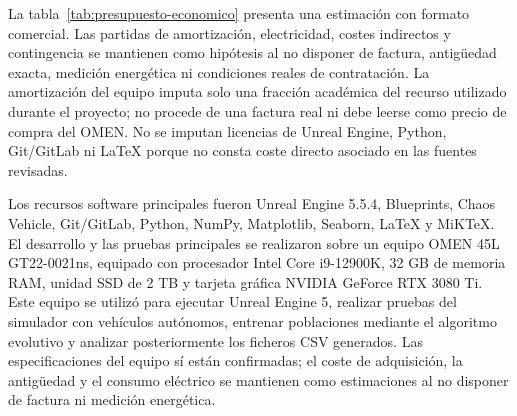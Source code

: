 La tabla~\ref{tab:presupuesto-economico} presenta una estimación con formato comercial. Las partidas de amortización, electricidad, costes indirectos y contingencia se mantienen como hipótesis al no disponer de factura, antigüedad exacta, medición energética ni condiciones reales de contratación. La amortización del equipo imputa solo una fracción académica del recurso utilizado durante el proyecto; no procede de una factura real ni debe leerse como precio de compra del OMEN. No se imputan licencias de Unreal Engine, Python, Git/GitLab ni LaTeX porque no consta coste directo asociado en las fuentes revisadas.

Los recursos software principales fueron Unreal Engine 5.5.4, Blueprints, Chaos Vehicle, Git/GitLab, Python, NumPy, Matplotlib, Seaborn, LaTeX y MiKTeX. El desarrollo y las pruebas principales se realizaron sobre un equipo OMEN 45L GT22-0021ns, equipado con procesador Intel Core i9-12900K, 32 GB de memoria RAM, unidad SSD de 2 TB y tarjeta gráfica NVIDIA GeForce RTX 3080 Ti. Este equipo se utilizó para ejecutar Unreal Engine 5, realizar pruebas del simulador con vehículos autónomos, entrenar poblaciones mediante el algoritmo evolutivo y analizar posteriormente los ficheros CSV generados. Las especificaciones del equipo sí están confirmadas; el coste de adquisición, la antigüedad y el consumo eléctrico se mantienen como estimaciones al no disponer de factura ni medición energética.

